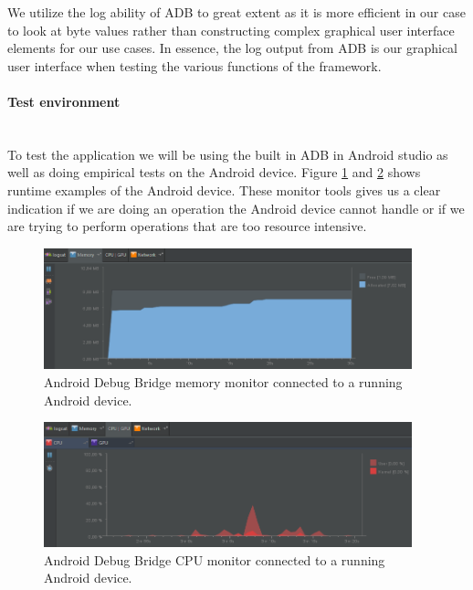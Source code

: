 We utilize the log ability of ADB to great extent as it is more efficient in our case to look at byte values rather than constructing complex graphical user interface elements for our use cases. In essence, the log output from ADB is our graphical user interface when testing the various functions of the framework.

\paragraph{Test environment}\mbox{}\\
To test the application we will be using the built in ADB in Android studio as well as doing empirical tests on the Android device. Figure \ref{fig:ADBMemory} and \ref{fig:ADBCPU} shows runtime examples of the Android device. These monitor tools gives us a clear indication if we are doing an operation the Android device cannot handle or if we are trying to perform operations that are too resource intensive.

\begin{figure}[h!]
  \caption{Android Debug Bridge memory monitor connected to a running Android device.}
  \label{fig:ADBMemory}
  \centering
    \includegraphics[width=0.95\textwidth]{images/ADBMemory.png}
\end{figure}

\begin{figure}[h!]
  \caption{Android Debug Bridge CPU monitor connected to a running Android device.}
  \label{fig:ADBCPU}
  \centering
    \includegraphics[width=0.95\textwidth]{images/ADBCPU.png}
\end{figure}

